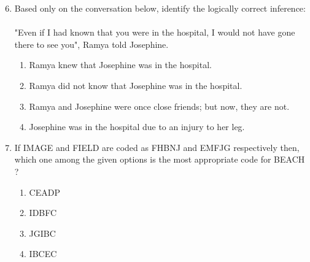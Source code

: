 \documentclass[journal]{IEEEtran}
\theoremstyle{remark}
\begin{document}
\begin{enumerate}[itemsep=1em]
\setcounter{enumi}{5}
\item Based only on the conversation below, identify the logically correct inference: \\
\\
"Even if I had known that you were in the hospital, I would not have gone there to see you", Ramya told Josephine. 

\begin{enumerate}[leftmargin=2.5em, labelsep=0.5em, itemsep=0.5em]
   \item Ramya knew that Josephine was in the hospital. 
   \item Ramya did not know that Josephine was in the hospital. 
   \item Ramya and Josephine were once close friends; but now, they are not. 
   \item Josephine was in the hospital due to an injury to her leg. 
\end{enumerate}
\end{enumerate}

\begin{enumerate}[itemsep=1em]
\setcounter{enumi}{6}
\item If IMAGE and FIELD are coded as FHBNJ and EMFJG respectively then, which one among the given options is the most appropriate code for BEACH ? 

\begin{multicols}{4}
\begin{enumerate}
    \item CEADP
    \item IDBFC
    \item JGIBC
    \item IBCEC
\end{enumerate}
\end{multicols}
\end{enumerate}

\newpage
\vspace*{0.25cm}
\end{document}
